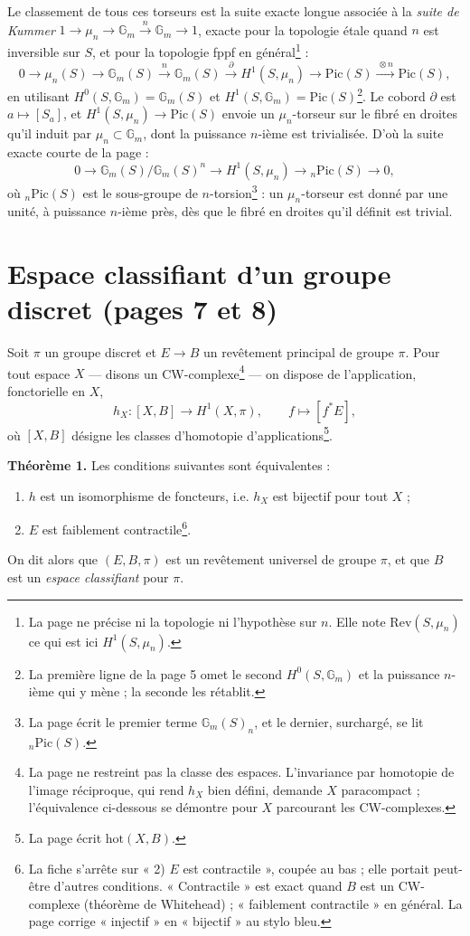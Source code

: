 \documentclass[11pt,a4paper]{article}
\begin{document}
Le classement de tous ces torseurs est la suite exacte longue associée à la
\emph{suite de Kummer} $1 \to \mu_n \to \mathbb{G}_m \xrightarrow{\,n\,} \mathbb{G}_m \to 1$,
exacte pour la topologie étale quand $n$ est inversible sur $S$, et pour la
topologie fppf en général\footnote{La page ne précise ni la topologie ni
l'hypothèse sur $n$. Elle note $\mathrm{Rev}(S, \mu_n)$ ce qui est ici
$H^1(S, \mu_n)$.} :
\[
0 \to \mu_n(S) \to \mathbb{G}_m(S) \xrightarrow{\,n\,} \mathbb{G}_m(S)
\xrightarrow{\ \partial\ } H^1(S, \mu_n) \to \mathrm{Pic}(S)
\xrightarrow{\,\otimes n\,} \mathrm{Pic}(S),
\]
en utilisant $H^0(S, \mathbb{G}_m) = \mathbb{G}_m(S)$ et
$H^1(S, \mathbb{G}_m) = \mathrm{Pic}(S)$\footnote{La première ligne de la page 5
omet le second $H^0(S, \mathbb{G}_m)$ et la puissance $n$-ième qui y mène ; la
seconde les rétablit.}. Le cobord $\partial$ est $a \mapsto [S_a]$, et
$H^1(S, \mu_n) \to \mathrm{Pic}(S)$ envoie un $\mu_n$-torseur sur le fibré en droites
qu'il induit par $\mu_n \subset \mathbb{G}_m$, dont la puissance $n$-ième est
trivialisée. D'où la suite exacte courte de la page :
\[
0 \to \mathbb{G}_m(S)/\mathbb{G}_m(S)^{n} \longrightarrow H^1(S, \mu_n)
\longrightarrow {}_{n}\mathrm{Pic}(S) \to 0,
\]
où ${}_{n}\mathrm{Pic}(S)$ est le sous-groupe de $n$-torsion\footnote{La page écrit
le premier terme $\mathbb{G}_m(S)_n$, et le dernier, surchargé, se lit
${}_n\mathrm{Pic}(S)$.} : un $\mu_n$-torseur est donné par une unité, à puissance
$n$-ième près, dès que le fibré en droites qu'il définit est trivial.

\section*{Espace classifiant d'un groupe discret (pages 7 et 8)}

Soit $\pi$ un groupe discret et $E \to B$ un revêtement principal de groupe
$\pi$. Pour tout espace $X$ — disons un CW-complexe\footnote{La page ne
restreint pas la classe des espaces. L'invariance par homotopie de l'image
réciproque, qui rend $h_X$ bien défini, demande $X$ paracompact ; l'équivalence
ci-dessous se démontre pour $X$ parcourant les CW-complexes.} — on dispose de
l'application, fonctorielle en $X$,
\[
h_X : [X, B] \longrightarrow H^1(X, \pi), \qquad f \longmapsto [f^{*}E],
\]
où $[X, B]$ désigne les classes d'homotopie d'applications\footnote{La page
écrit $\mathrm{hot}(X, B)$.}.

\textbf{Théorème 1.} Les conditions suivantes sont équivalentes :
\begin{enumerate}
  \item $h$ est un isomorphisme de foncteurs, i.e. $h_X$ est bijectif pour tout
    $X$ ;
  \item $E$ est faiblement contractile\footnote{La fiche s'arrête sur
    « 2) $E$ est contractile », coupée au bas ; elle portait peut-être d'autres
    conditions. « Contractile » est exact quand $B$ est un CW-complexe (théorème
    de Whitehead) ; « faiblement contractile » en général. La page corrige
    « injectif » en « bijectif » au stylo bleu.}.
\end{enumerate}
On dit alors que $(E, B, \pi)$ est un revêtement universel de groupe $\pi$, et
que $B$ est un \emph{espace classifiant} pour $\pi$.
\end{document}
